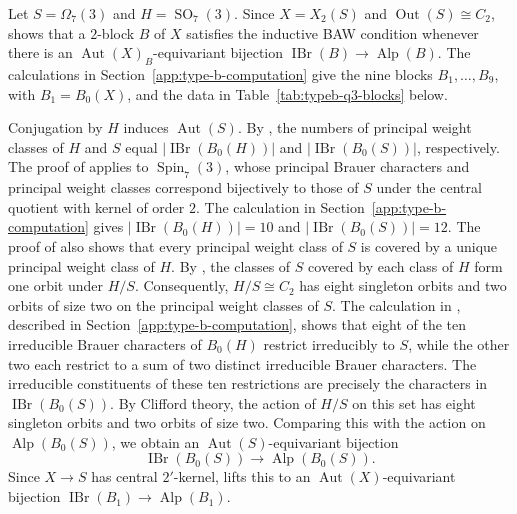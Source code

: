 \documentclass[10pt]{amsart}
\theoremstyle{definition}
\let\oldendproof\endproof
\renewenvironment{proof}[1][\proofname]{%
  \oldproof[\bfseries #1]%
}{\oldendproof}
\DeclareMathOperator{\Aut}{Aut}
\DeclareMathOperator{\Out}{Out}
\DeclareMathOperator{\IBr}{IBr}
\DeclareMathOperator{\Alp}{Alp}
\numberwithin{equation}{section}
\numberwithin{table}{section}
\begin{document}
\begin{proof}
Let $S=\Omega_7(3)$ and $H=\operatorname{SO}_7(3)$.  Since $X=X_2(S)$
and $\Out(S)\cong C_2$, \cite[Corollary~2.13]{FengLiZhang2019} shows
that a $2$-block $B$ of $X$ satisfies the inductive BAW condition whenever
there is an $\Aut(X)_B$-equivariant bijection
$\IBr(B)\to\Alp(B)$.  The calculations in
Section~\ref{app:type-b-computation} give the nine blocks
$B_1,\ldots,B_9$, with $B_1=B_0(X)$, and the data in
Table~\ref{tab:typeb-q3-blocks} below.

Conjugation by $H$ induces $\Aut(S)$.
By \cite[Lemma~5.7 and the proof of Proposition~5.11]{FengYuZhang2024},
the numbers of principal weight classes of $H$ and $S$ equal
$|\IBr(B_0(H))|$ and $|\IBr(B_0(S))|$, respectively.
The proof of \cite[Proposition~5.11]{FengYuZhang2024} applies to
$\operatorname{Spin}_7(3)$, whose principal
Brauer characters and principal weight classes correspond bijectively
to those of $S$ under the central quotient with kernel of order $2$.
The calculation in Section~\ref{app:type-b-computation} gives
$|\IBr(B_0(H))|=10$ and $|\IBr(B_0(S))|=12$.
The proof of \cite[Proposition~5.11]{FengYuZhang2024} also shows that
every principal weight class of $S$ is covered by a unique principal
weight class of $H$.
By \cite[Corollary~2.22(2)]{FengYuZhang2024}, the classes of $S$
covered by each class of $H$ form one orbit under $H/S$.
Consequently, $H/S\cong C_2$ has eight singleton orbits and two
orbits of size two on the principal weight classes of $S$.
The calculation in , described in
Section~\ref{app:type-b-computation}, shows that eight of the ten
irreducible Brauer characters of $B_0(H)$ restrict irreducibly to $S$,
while the other two each restrict to a sum of two distinct irreducible
Brauer characters. The irreducible constituents of these ten
restrictions are precisely the characters in $\IBr(B_0(S))$.
By Clifford theory, the action of $H/S$ on this set has eight singleton
orbits and two orbits of size two.  Comparing this with the action on
$\Alp(B_0(S))$, we obtain an $\Aut(S)$-equivariant bijection
\[
 \IBr(B_0(S))\longrightarrow\Alp(B_0(S)).
\]
Since $X\to S$ has central
$2'$-kernel, \cite[Lemma~2.5]{FengLiZhang2019} lifts this to an
$\Aut(X)$-equivariant bijection $\IBr(B_1)\to\Alp(B_1)$.


\end{proof}
\end{document}
